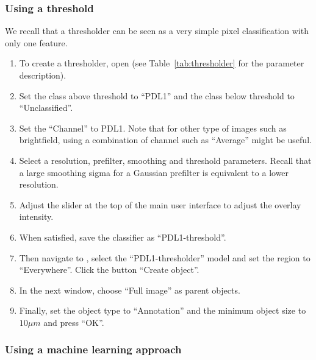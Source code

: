 \documentclass[a4paper,DIV=17,dvipsnames,headsepline]{scrartcl}
\begin{document}
\subsubsection{Using a threshold}
We recall that a thresholder can be seen as a very simple pixel classification with only one feature.
\begin{enumerate}
\item To create a thresholder, open  (see Table~\ref{tab:thresholder} for the parameter description).
\item Set the class above threshold to ``PDL1'' and the class below threshold to ``Unclassified''.
\item Set the ``Channel'' to PDL1. Note that for other type of images such as brightfield, using a combination of channel such as ``Average'' might be useful.
\item Select a resolution, prefilter, smoothing and threshold parameters. Recall that a large smoothing sigma for a Gaussian prefilter is equivalent to a lower resolution.
\item Adjust the slider at the top of the main user interface to adjust the overlay intensity. 
\item When satisfied, save the classifier as ``PDL1-threshold''.
\item Then navigate to , select the ``PDL1-thresholder'' model and set the region to ``Everywhere''. Click the button ``Create object''.
\item In the next window, choose ``Full image'' as parent objects. 
\item Finally, set the object type to ``Annotation'' and the minimum object size to $10\mu m$ and press ``OK''.
\end{enumerate}

\subsubsection{Using a machine learning approach}
\end{document}

